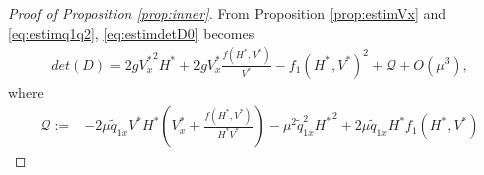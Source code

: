 \documentclass[11pt]{article}
\begin{document}
\begin{proof}[Proof of Proposition \ref{prop:inner}]
From Proposition \ref{prop:estimVx} and \eqref{eq:estimq1q2}, \eqref{eq:estimdetD0} becomes
\begin{equation}
    \label{eq:estimdetD1}
\begin{split}
det(D) =  {2}g{V^{*}_{x}}^{2}{H^{*}}
+{2}g{V^{*}_{x}}\frac{f({H^{*}},{V^{*}})}{{V^{*}}} -f_{1}({H^{*}},{V^{*}})^{2}+{\mathcal{Q}}+O(\mu^{3}),
\end{split}
\end{equation}
{where
\begin{equation}
    \begin{split}
        \mathcal{Q}:=&-2\mu \widetilde{q}_{1x}V^{*}H^{*}\left(V_{x}^{*}+\frac{f(H^{*},V^{*})}{H^{*}V^{*}}\right) -\mu^{2} \widetilde{q}_{1x}^{2}{H^{*}}^{2}+2\mu \widetilde{q}_{1x}H^{*}f_{1}(H^{*},V^{*})
    \end{split}
\end{equation}
}



\end{proof}
\end{document}
